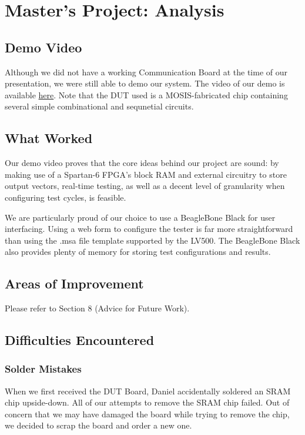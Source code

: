 \section{Master's Project: Analysis}

\subsection{Demo Video}
Although we did not have a working Communication Board at the time of our presentation, we were still able to demo our system. The video of our demo is available \href{https://www.youtube.com/watch?v=Cojl8VEp_cA&feature=youtu.be}{here}. Note that the DUT used is a MOSIS-fabricated chip containing several simple combinational and sequnetial circuits.

\subsection{What Worked}
Our demo video proves that the core ideas behind our project are sound: by making use of a Spartan-6 FPGA's block RAM and external circuitry to store output vectors, real-time testing, as well as a decent level of granularity when configuring test cycles, is feasible. 

We are particularly proud of our choice to use a BeagleBone Black for user interfacing. Using a web form to configure the tester is far more straightforward than using the .msa file template supported by the LV500. The BeagleBone Black also provides plenty of memory for storing test configurations and results.

\subsection{Areas of Improvement}
Please refer to Section 8 (Advice for Future Work).

\subsection{Difficulties Encountered}

\subsubsection{Solder Mistakes}
When we first received the DUT Board, Daniel accidentally soldered an SRAM chip upside-down. All of our attempts to remove the SRAM chip failed. Out of concern that we may have damaged the board while trying to remove the chip, we decided to scrap the board and order a new one.


